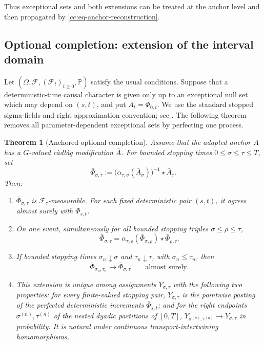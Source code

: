 \documentclass[10pt,reqno]{amsart}
\theoremstyle{plain}
\newtheorem{theorem}{Theorem}[section]
\theoremstyle{definition}
\theoremstyle{remark}
\begin{document}
Thus exceptional sets and both extensions can be treated at the anchor
level and then propagated by \eqref{cc:eq-anchor-reconstruction}.

\subsection{Optional completion: extension of the interval domain}

Let \((\Omega,{\mathcal F},({\mathcal F}_t)_{t\ge0},{\mathbb P})\) satisfy the usual conditions.
Suppose that a deterministic-time causal character is given only up to an
exceptional null set which may depend on \((s,t)\), and put
\(A_t=\Phi_{0,t}\).  We use the standard stopped sigma-fields and right
approximation convention; see \cite[Ch.~I]{JacodShiryaev03}.  The following
theorem removes all parameter-dependent exceptional sets by perfecting one
process.

\begin{theorem}[Anchored optional completion]
\label{cc:thm-optional-completion}
Assume that the adapted anchor \(A\) has a \(G\)-valued càdlàg modification
\(\bar A\).  For bounded stopping times \(0\le\sigma\le\tau\le T\), set
\begin{equation}
 \bar\Phi_{\sigma,\tau}
 :=\bigl(\alpha_{\tau,\sigma}(\bar A_\sigma)\bigr)^{-1}
    \star\bar A_\tau.
 \label{cc:eq-optional-anchor}
\end{equation}
Then:

\begin{enumerate}[label=\textup{(\roman*)},leftmargin=2.8em]
\item \(\bar\Phi_{\sigma,\tau}\) is \({\mathcal F}_\tau\)-measurable.  For each
fixed deterministic pair \((s,t)\), it agrees almost surely with
\(\Phi_{s,t}\).

\item On one event, simultaneously for all bounded stopping triples
\(\sigma\le\rho\le\tau\),
\begin{equation}
 \bar\Phi_{\sigma,\tau}
 =\alpha_{\tau,\rho}(\bar\Phi_{\sigma,\rho})
  \star\bar\Phi_{\rho,\tau}.
 \label{cc:eq-optional-Chen}
\end{equation}

\item If bounded stopping times
\(\sigma_n\downarrow\sigma\) and \(\tau_n\downarrow\tau\), with
\(\sigma_n\le\tau_n\), then
\begin{equation}
 \bar\Phi_{\sigma_n,\tau_n}\longrightarrow
 \bar\Phi_{\sigma,\tau}
 \qquad\text{almost surely}.
 \label{cc:eq-right-simple-limit}
\end{equation}

\item This extension is unique among assignments \(Y_{\sigma,\tau}\) with
the following two properties: for every finite-valued stopping pair,
\(Y_{\sigma,\tau}\) is the pointwise pasting of the perfected deterministic
increments \(\bar\Phi_{s,t}\); and for the right endpoints
\(\sigma^{(n)},\tau^{(n)}\) of the nested dyadic partitions of \([0,T]\),
\(Y_{\sigma^{(n)},\tau^{(n)}}\to Y_{\sigma,\tau}\) in probability.  It is
natural under continuous transport-intertwining homomorphisms.
\end{enumerate}
\end{theorem}
\end{document}
